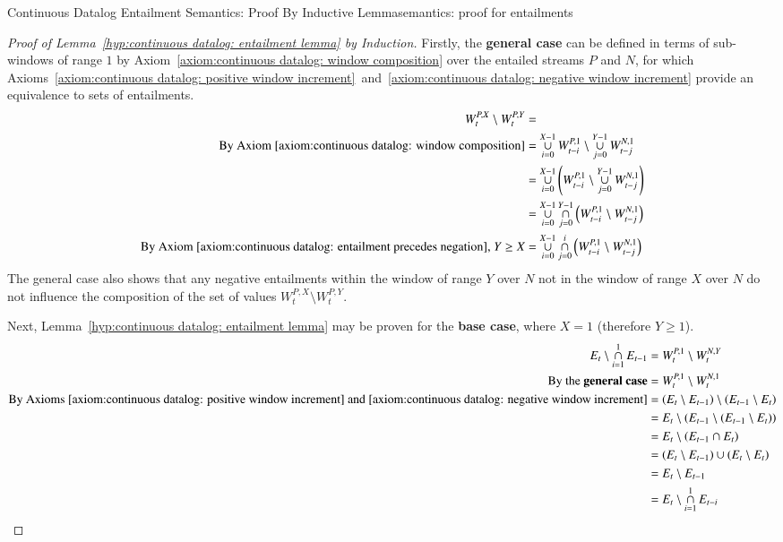 \begin{nestedsection}{Continuous Datalog Entailment Semantics: Proof By Inductive Lemma}{semantics: proof for entailments}
\begin{proof}[Proof of Lemma~\ref{hyp:continuous datalog: entailment lemma} by Induction]
		Firstly, the \textbf{general case} can be defined in terms of sub-windows of range $1$ by Axiom~\ref{axiom:continuous datalog: window composition} over the entailed streams $P$ and $N$, for which Axioms~\ref{axiom:continuous datalog: positive window increment}~and~\ref{axiom:continuous datalog: negative window increment} provide an equivalence to sets of entailments.
		\begin{align*}
			W^{P,X}_t \setminus W^{P,Y}_t & = \\
			\text{By Axiom~\ref{axiom:continuous datalog: window composition}} & = \mathop{\cup}^{X-1}_{i=0}W^{P,1}_{t-i} \setminus \mathop{\cup}^{Y-1}_{j=0}W^{N,1}_{t-j} \\
			& = \mathop{\cup}^{X-1}_{i=0} \left( W^{P,1}_{t-i} \setminus \mathop{\cup}^{Y-1}_{j=0}W^{N,1}_{t-j} \right) \\
			& = \mathop{\cup}^{X-1}_{i=0}\mathop{\cap}^{Y-1}_{j=0} \left( W^{P,1}_{t-i} \setminus W^{N,1}_{t-j} \right) \\
			\text{By Axiom~\ref{axiom:continuous datalog: entailment precedes negation}, } Y \geq X & = \mathop{\cup}^{X-1}_{i=0}\mathop{\cap}^{i}_{j=0} \left( W^{P,1}_{t-i} \setminus W^{N,1}_{t-j} \right)
		\end{align*}
		The general case also shows that any negative entailments within the window of range $Y$ over $N$ not in the window of range $X$ over $N$ do not influence the composition of the set of values ${W^{P,X}_t \setminus W^{P,Y}_t}$.

		Next, Lemma~\ref{hyp:continuous datalog: entailment lemma} may be proven for the \textbf{base case}, where ${X = 1}$ (therefore ${Y \geq 1}$).
		\begin{align*}
			E_t \setminus \mathop{\cap}^{1}_{i=1} E_{t-1} & = W^{P,1}_t \setminus W^{N,Y}_t \\
			\text{By the \textbf{general case}} & = W^{P,1}_t \setminus W^{N,1}_t \\
			\text{By Axioms~\ref{axiom:continuous datalog: positive window increment}~and~\ref{axiom:continuous datalog: negative window increment}} & = \left( E_t \setminus E_{t-1} \right) \setminus \left( E_{t-1} \setminus E_t \right) \\
			& = E_t \setminus \left( E_{t-1} \setminus \left( E_{t-1} \setminus E_t \right) \right) \\
			& = E_t \setminus \left( E_{t-1} \cap E_t \right) \\
			& = \left( E_t \setminus E_{t-1} \right) \cup \left( E_t \setminus E_t \right) \\
			& = E_t \setminus E_{t-1} \\
			& = E_t \setminus \mathop{\cap}^{1}_{i=1} E_{t-i} \qedhere
		\end{align*}


\end{proof}
\end{nestedsection}
